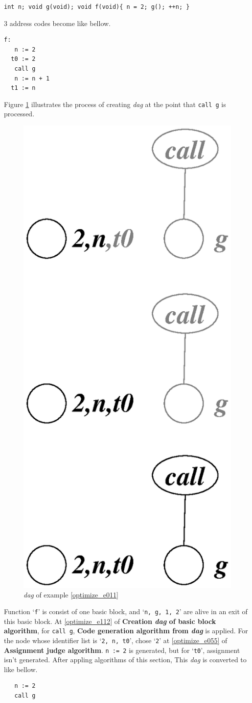 \begin{Example}
\label{optimize_e011}
\begin{verbatim}
int n; void g(void); void f(void){ n = 2; g(); ++n; }
\end{verbatim}
3 address codes become like bellow.
\begin{verbatim}
f:
   n := 2
  t0 := 2
   call g
   n := n + 1
  t1 := n
\end{verbatim}
Figure \ref{optimize_e012} illustrates the process of creating
{\em dag} at the point that {\tt{call g}} is processed.

\begin{figure}[htbp]
\begin{center}
\includegraphics[width=0.530\linewidth,height=1.0\linewidth]{opt003.eps}
\caption{{\em dag} of example \ref{optimize_e011}}
\label{optimize_e012}
\end{center}
\end{figure}
Function `{\tt{f}}' is consist of one basic block, and 
`{\tt{n, g, 1, 2}}' are alive in an exit of this basic block.
At \ref{optimize_e112} of {\bf Creation {\em dag} of basic block algorithm},
for {\tt{call g}},
{\bf Code generation algorithm from {\em dag}} is applied.
For the node whose identifier list is `{\tt{2, n, t0}}',
chose `{\tt{2}}'
at \ref{optimize_e055} of {\bf Assignment judge algorithm}.
{\tt{n := 2}} is generated, but for `{\tt{t0}}', 
assignment isn't generated. 
After appling algorithms of this section,
This {\em dag} is converted to like bellow.
\begin{verbatim}
   n := 2
   call g
\end{verbatim}
\end{Example}

